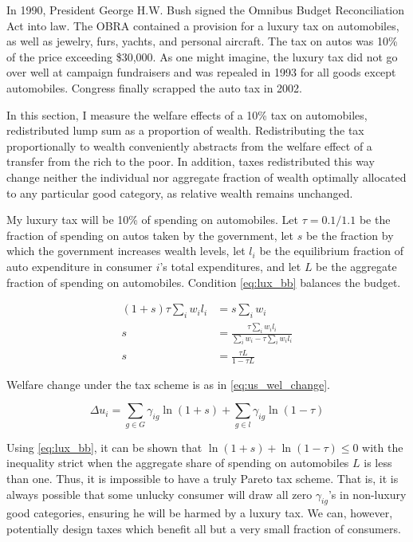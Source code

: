 \documentclass[12pt]{article}
\begin{document}
In 1990, President George H.W. Bush signed the Omnibus Budget Reconciliation Act into law.\footnotemark{}  The OBRA contained a provision for a luxury tax on automobiles, as well as jewelry, furs, yachts, and personal aircraft.  The tax on autos was 10\% of the price exceeding \$30,000.  As one might imagine, the luxury tax did not go over well at campaign fundraisers and was repealed in 1993 for all goods except automobiles.\footnotemark{}  Congress finally scrapped the auto tax in 2002.

In this section, I measure the welfare effects of a 10\% tax on automobiles, redistributed lump sum as a proportion of wealth.  Redistributing the tax proportionally to wealth conveniently abstracts from the welfare effect of a transfer from the rich to the poor.  In addition, taxes redistributed this way change neither the individual nor aggregate fraction of wealth optimally allocated to any particular good category, as relative wealth remains unchanged.

My luxury tax will be 10\% of spending on automobiles.  Let $\tau = 0.1 / 1.1$ be the fraction of spending on autos taken by the government, let $s$ be the fraction by which the government increases wealth levels, let $l_i$ be the equilibrium fraction of auto expenditure in consumer $i$'s total expenditures, and let $L$ be the aggregate fraction of spending on automobiles.  Condition \eqref{eq:lux_bb} balances the budget.

\begin{align}
    (1 + s) \tau \sum_i w_i l_i &= s \sum_i w_i \nonumber \\
    s &= \frac{\tau \sum_i w_i l_i}{\sum_i w_i - \tau \sum_i w_i l_i} \nonumber \\
    \label{eq:lux_bb}
    s &= \frac{\tau L}{1 - \tau L}
\end{align}

Welfare change under the tax scheme is as in \eqref{eq:us_wel_change}.

\begin{equation}
    \label{eq:us_wel_change}
    \Delta u_i = \sum_{g\in G} \gamma_{ig} \ln(1 + s) + \sum_{g\in l} \gamma_{ig} \ln (1 - \tau)
\end{equation}

Using \eqref{eq:lux_bb}, it can be shown that $\ln(1+s) + \ln(1 - \tau) \leq 0$ with the inequality strict when the aggregate share of spending on automobiles $L$ is less than one.  Thus, it is impossible to have a truly Pareto tax scheme.  That is, it is always possible that some unlucky consumer will draw all zero $\gamma_{ig}$'s in non-luxury good categories, ensuring he will be harmed by a luxury tax.  We can, however, potentially design taxes which benefit all but a very small fraction of consumers.
\end{document}
